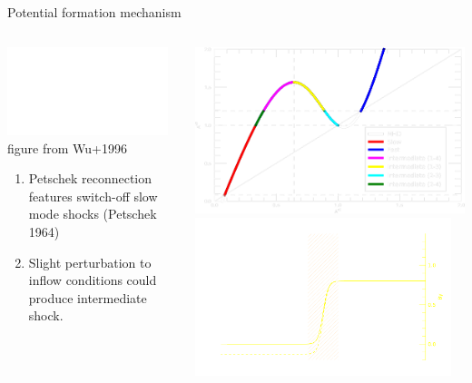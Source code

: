 \documentclass[10pt,aspectratio=169,usenames,dvipsnames]{beamer}
\begin{document}
\begin{frame}{Potential formation mechanism}
\begin{columns}
\begin{column}{0.5\textwidth}
\includegraphics[width=0.95\textwidth]{2023NAM/Figures/Wu_petscheck_drawing.png} \\ {\small figure from Wu+1996}
\begin{enumerate}
\item Petschek reconnection features switch-off slow mode shocks (Petschek 1964)
\item Slight perturbation to inflow conditions could produce intermediate shock.
\end{enumerate}
\end{column}
\begin{column}{0.5\textwidth}
\includegraphics[width=0.95\linewidth]{2023NAM/Figures/shockjumps_0.125pi.png} \\
\includegraphics[width=0.95\textwidth]{2023NAM/Figures/shockschem.png}

\end{column}
\end{columns}
\end{frame}
\end{document}
